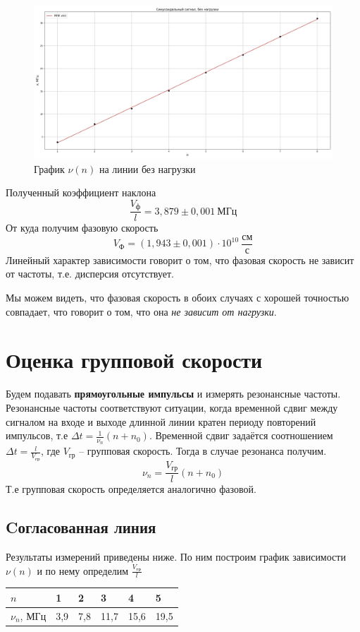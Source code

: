 \documentclass[a4paper,12pt]{article}
\theoremstyle{definition}
\begin{document}
	\begin{figure}[h]
		\centering
		\includegraphics[scale=0.38]{graph22.png}
		\caption{График $\nu(n)$ на линии без нагрузки}
	\end{figure}
	Полученный коэффициент наклона
	\[\frac{V_\text{ф}}{l}=3,879\pm0,001\:\text{МГц}\]
	От куда получим фазовую скорость
	\begin{equation}
		V_\text{Ф}=(1,943\pm0,001)\cdot10^{10}\:\frac{\text{см}}{\text{с}}
	\end{equation}
	Линейный характер зависимости говорит о том, что фазовая скорость не зависит от частоты, т.е. дисперсия отсутствует.
	
	Мы можем видеть, что фазовая скорость в обоих случаях с хорошей точностью совпадает, что говорит о том, что она \textit{не зависит от нагрузки}.


	\newpage


	\section{Оценка групповой скорости}
	Будем подавать \textbf{прямоугольные импульсы} и измерять резонансные частоты. Резонансные частоты соответствуют ситуации, когда
	временной сдвиг между сигналом на входе и выходе длинной линии кратен периоду
	повторений импульсов, т.е $\Delta t = \frac{1}{\nu_n}(n+n_0)$. Временной сдвиг задаётся соотношением
	$\Delta t=\frac{l}{V_\text{гр}}$, где $V_\text{гр}$ -- групповая скорость. Тогда в случае резонанса получим.
	\begin{equation}
		\nu_n=\frac{V_\text{гр}}{l}(n+n_0)
	\end{equation}
	Т.е групповая скорость определяется аналогично фазовой.
	

	\subsection{Cогласованная линия}
	Результаты измерений приведены ниже. По ним построим график зависимости $\nu(n)$ и по нему определим $\frac{V_\text{гр}}{l}$
 	\begin{table}[h!]
		\begin{center}
 		\begin{tabular}{|l|l|l|l|l|l|} \hline
 			$n$          & 1   & 2   & 3    & 4    & 5    \\ \hline
 			$\nu_n$, МГц & 3,9 & 7,8 & 11,7 & 15,6 & 19,5 \\ \hline
 		\end{tabular}
		\end{center}
 	\end{table}
\end{document}
